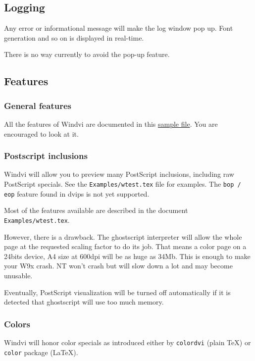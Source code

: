 \documentclass[a4paper,11pt]{article}
\def\WDVI{\textsf{Windvi}}
\begin{document}
\subsection{Logging}

Any error or informational message will  make the log window pop
up. Font generation and so on is displayed in real-time.

There is no way currently to avoid the pop-up feature.

\subsection{Features}

\subsubsection{General features}

All the features of \WDVI{} are documented in this
\href{file://examples/wtest.tex}{sample file}. You are encouraged to
look at it.

\subsubsection{Postscript inclusions}

\WDVI{} will allow you to preview many PostScript inclusions,
including raw PostScript specials. See the \texttt{Examples/wtest.tex} 
file for examples. The \texttt{bop / eop} feature found in dvips is
not yet supported.

Most of the features available are described in the document
\texttt{Examples/wtest.tex}.

However, there is a drawback. The ghostscript interpreter will allow
the whole page at the requested scaling factor to do its job. That
means a color page on a 24bits device, A4 size at 600dpi will be as
huge as 34Mb. This is enough to make your W9x crash. NT won't crash
but will slow down a lot and may become unusable.

Eventually, PostScript visualization will be turned off automatically
if it is detected that ghostscript will use too much memory.

\subsubsection{Colors}

\WDVI{} will honor color specials as introduced either by
\texttt{colordvi} (plain \TeX{}) or \texttt{color} package (\LaTeX{}).
\end{document}
